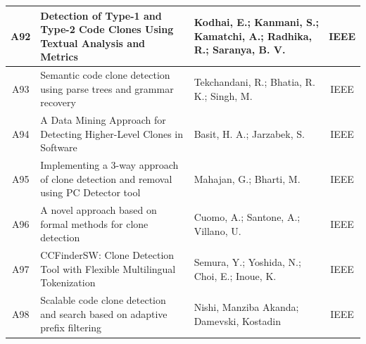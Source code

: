 \begin{table}[ht]
{\begin{tabular}{cllc}
			
			A92  & Detection of Type-1 and Type-2 Code Clones Using Textual Analysis and Metrics                                                                  & Kodhai, E.; Kanmani, S.; Kamatchi, A.; Radhika, R.; Saranya, B. V.                                                         & IEEE                                                      \\\hline 
			A93  & Semantic code clone detection using parse trees and grammar recovery                                                                           & Tekchandani, R.; Bhatia, R. K.; Singh, M.                                                                                  & IEEE                                                      \\\hline 
			A94  & A Data Mining Approach for Detecting Higher-Level Clones in Software                                                                           & Basit, H. A.; Jarzabek, S.                                                                                                 & IEEE                                                      \\\hline 
			A95  & Implementing a 3-way approach of clone detection and removal using PC Detector tool                                                            & Mahajan, G.; Bharti, M.                                                                                                    & IEEE                                                      \\\hline 
			A96  & A novel approach based on formal methods for clone detection                                                                                   & Cuomo, A.; Santone, A.; Villano, U.                                                                                        & IEEE                                                      \\\hline 
			A97  & CCFinderSW: Clone Detection Tool with Flexible Multilingual Tokenization                                                                       & Semura, Y.; Yoshida, N.; Choi, E.; Inoue, K.                                                                               & IEEE                                                      \\\hline 
			A98  & Scalable code clone detection and search based on adaptive prefix filtering                                                                    & Nishi, Manziba Akanda; Damevski, Kostadin                                                                                  & IEEE                                                      \\\hline 

\end{tabular}}
\end{table}
